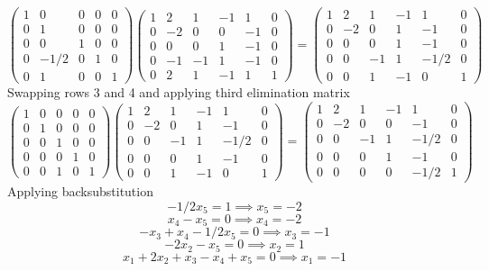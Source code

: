 \documentclass{article}
\begin{document}
\[
    \begin{pmatrix}
        1 & 0 & 0 & 0 & 0 \\
        0 & 1 & 0 & 0 & 0 \\
        0 & 0 & 1 & 0 & 0 \\
        0 & -1/2 & 0 & 1 & 0 \\
        0 & 1 & 0 & 0 & 1
    \end{pmatrix}
    \begin{pmatrix}
        1 & 2 & 1 & -1 & 1 & 0 \\
        0 & -2 & 0 & 0 & -1 & 0 \\
        0 & 0 & 0 & 1 & -1 & 0 \\
        0 & -1 & -1 & 1 & -1 & 0 \\
        0 & 2 & 1 & -1 & 1 & 1
    \end{pmatrix}
    =
    \begin{pmatrix}
        1 & 2 & 1 & -1 & 1 & 0 \\
        0 & -2 & 0 & 1 & -1 & 0 \\
        0 & 0 & 0 & 1 & -1 & 0 \\
        0 & 0 & -1 & 1 & -1/2 & 0 \\
        0 & 0 & 1 & -1 & 0 & 1
    \end{pmatrix}
\]
Swapping rows 3 and 4 and applying third elimination matrix
\[
    \begin{pmatrix}
        1 & 0 & 0 & 0 & 0 \\
        0 & 1 & 0 & 0 & 0 \\
        0 & 0 & 1 & 0 & 0 \\
        0 & 0 & 0 & 1 & 0 \\
        0 & 0 & 1 & 0 & 1
    \end{pmatrix}
    \begin{pmatrix}
        1 & 2 & 1 & -1 & 1 & 0 \\
        0 & -2 & 0 & 1 & -1 & 0 \\
        0 & 0 & -1 & 1 & -1/2 & 0 \\
        0 & 0 & 0 & 1 & -1 & 0 \\
        0 & 0 & 1 & -1 & 0 & 1
    \end{pmatrix}
    =
    \begin{pmatrix}
        1 & 2 & 1 & -1 & 1 & 0 \\
        0 & -2 & 0 & 0 & -1 & 0 \\
        0 & 0 & -1 & 1 & -1/2 & 0 \\
        0 & 0 & 0 & 1 & -1 & 0 \\
        0 & 0 & 0 & 0 & -1/2 & 1
    \end{pmatrix}
\]
Applying backsubstitution
$$ -1/2 x_5 = 1 \implies x_5 = -2 $$
$$ x_4 - x_5 = 0 \implies x_4 = -2 $$
$$ -x_3 + x_4 - 1/2 x_5 = 0 \implies x_3 = -1 $$
$$ -2 x_2 - x_5 = 0 \implies x_2 = 1 $$
$$ x_1 + 2 x_2 + x_3 - x_4 + x_5 = 0 \implies x_1 = -1 $$
\end{document}

